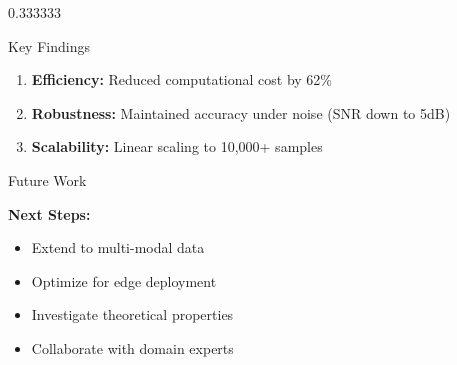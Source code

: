 \documentclass[final,xcolor={table}]{beamer}
\begin{document}
\begin{frame}[t]
\begin{postergrid}[3]
\begin{postergridcolumn}{0.333333}
\begin{exampleblock}{Key Findings}
\begin{enumerate}
  \item \textbf{Efficiency:} Reduced computational cost by 62\%

  \item \textbf{Robustness:} Maintained accuracy under noise (SNR down to 5dB)

  \item \textbf{Scalability:} Linear scaling to 10,000+ samples
\end{enumerate}

\end{exampleblock}


\begin{block}{Future Work}

\textbf{Next Steps:}
\begin{itemize}
  \item Extend to multi-modal data
  \item Optimize for edge deployment
  \item Investigate theoretical properties
  \item Collaborate with domain experts
\end{itemize}

\end{block}

\end{postergridcolumn}

\end{postergrid}

\end{frame}
\end{document}
